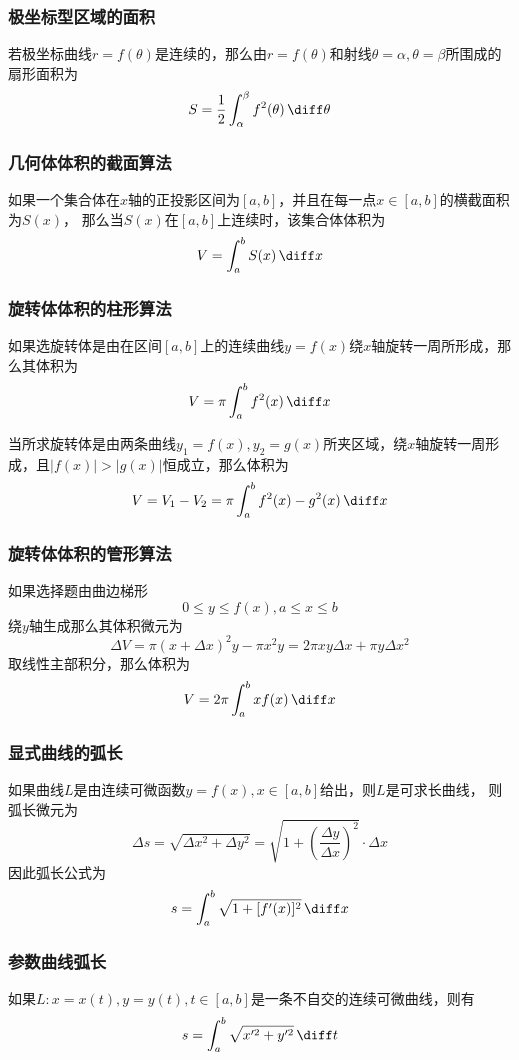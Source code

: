 \subsubsection{极坐标型区域的面积}
若极坐标曲线$r=f(\theta)$是连续的，那么由$r=f(\theta)$和射线$\theta=\alpha,\theta=\beta$所围成的扇形面积为
\[ S = \frac{1}{2}\int_\alpha^\beta f^2(\theta)\,\diff\theta \]

\subsubsection{几何体体积的截面算法}
如果一个集合体在$x$轴的正投影区间为$[a,b]$，并且在每一点$x\in[a,b]$的横截面积为$S(x)$，
那么当$S(x)$在$[a,b]$上连续时，该集合体体积为
\[ V = \int_a^b S(x)\,\diff x \]

\subsubsection{旋转体体积的柱形算法}
如果选旋转体是由在区间$[a,b]$上的连续曲线$y=f(x)$绕$x$轴旋转一周所形成，那么其体积为
\[ V = \pi\int_a^bf^2(x)\,\diff x \]

当所求旋转体是由两条曲线$y_1=f(x),y_2=g(x)$所夹区域，绕$x$轴旋转一周形成，且$|f(x)| > |g(x)|$恒成立，那么体积为
\[ V = V_1 - V_2 = \pi\int_a^b f^2(x)-g^2(x)\,\diff x \]

\subsubsection{旋转体体积的管形算法}
如果选择题由曲边梯形
\[ 0\leq y \leq f(x), a\leq x \leq b \]
绕$y$轴生成那么其体积微元为
\[ \Delta V = \pi(x+\Delta x)^2y - \pi x^2y = 2\pi xy\Delta x + \pi y\Delta x^2  \]
取线性主部积分，那么体积为
\[ V = 2\pi\int_a^bxf(x)\,\diff x \]

\subsubsection{显式曲线的弧长}
如果曲线$L$是由连续可微函数$y=f(x),x\in[a,b]$给出，则$L$是可求长曲线，
则弧长微元为
\[ \Delta s = \sqrt{\Delta x^2 + \Delta y^2} = \sqrt{1+\left(\frac{\Delta y}{\Delta x}\right)^2}\cdot \Delta x \]
因此弧长公式为
\[ s = \int_a^b \sqrt{1+[f'(x)]^2}\,\diff x \]

\subsubsection{参数曲线弧长}如果$L: x=x(t), y=y(t),t\in[a,b]$是一条不自交的连续可微曲线，则有
\[ s = \int_a^b\sqrt{x'^2+y'^2}\,\diff t \]

